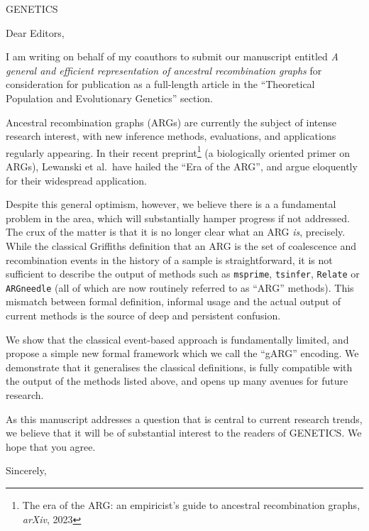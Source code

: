 \documentclass{letter}
\begin{document}
\begin{letter}{GENETICS}

\opening{Dear Editors,}

I am writing on behalf of my coauthors to submit our manuscript entitled
\emph{A general and efficient representation of ancestral recombination graphs}
for consideration for publication as a
full-length article in the
``Theoretical Population and Evolutionary Genetics'' section.

Ancestral recombination graphs (ARGs) are currently the subject of
intense research interest, with new inference methods, evaluations,
and applications regularly appearing.
In their recent preprint\footnote{The era of the ARG:
an empiricist’s guide to ancestral recombination graphs, \emph{arXiv}, 2023}
 (a biologically oriented primer
on ARGs), Lewanski et al.\ have hailed the ``Era of the ARG'', and
argue eloquently for their widespread application.

Despite this general optimism, however, we believe there is a
a fundamental problem in the area, which will substantially hamper
progress if not addressed.
The crux of the matter is that it is no longer clear
what an ARG \emph{is}, precisely.
While the classical Griffiths definition that
an ARG is the set of coalescence and recombination events
in the history of a sample is straightforward,
it is not sufficient to describe the output of methods
such as \texttt{msprime}, \texttt{tsinfer}, \texttt{Relate}
or \texttt{ARGneedle} (all of which are now routinely
referred to as ``ARG'' methods). This mismatch
between formal definition, informal usage and the
actual output of current methods is the source of deep
and persistent confusion.

We show that the classical event-based approach is
fundamentally limited, and propose a simple new
formal framework which we call the ``gARG''
encoding. We demonstrate that it generalises
the classical definitions, is fully compatible
with the output of the methods listed above,
and opens up many avenues for future research.

As this manuscript addresses a question
that is central to current research trends,
we believe that it will be of substantial interest
to the readers of GENETICS. We hope that you agree.


\closing{Sincerely,}

\end{letter}
\end{document}

